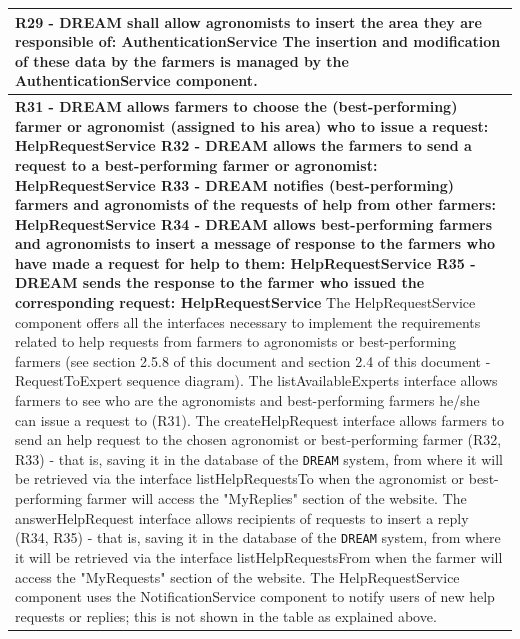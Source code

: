 \documentclass{article}
\begin{document}
\begin{longtable}[c]{|m{11.75cm}|}
    \textbf{R29 - DREAM shall allow agronomists to insert the area they are responsible of: AuthenticationService}
    \newline\newline
    The insertion and modification of these data by the farmers is managed by the AuthenticationService component.\\
    \hline
    
    \textbf{R31 - DREAM allows farmers to choose the (best-performing) farmer or agronomist (assigned to his area) who to issue a request: HelpRequestService
    \newline\newline
    R32 - DREAM allows the farmers to send a request to a best-performing farmer or agronomist: HelpRequestService
    \newline\newline
    R33 - DREAM notifies (best-performing) farmers and agronomists of the requests of help from other farmers: HelpRequestService
    \newline\newline
    R34 - DREAM allows best-performing farmers and agronomists to insert a message of response to the farmers who have made a request for help to them: HelpRequestService
    \newline\newline
    R35 - DREAM sends the response to the farmer who issued the corresponding request: HelpRequestService}
    \newline\newline
    The HelpRequestService component offers all the interfaces necessary to implement the requirements related to help requests from farmers to agronomists or best-performing farmers (see section 2.5.8 of this document  and section 2.4 of this document - RequestToExpert sequence diagram). The listAvailableExperts interface allows farmers to see who are the agronomists and best-performing farmers he/she can issue a request to (R31). The createHelpRequest interface allows farmers to send an help request to the chosen agronomist or best-performing farmer (R32, R33) - that is, saving it in the database of the \verb|DREAM| system, from where it will be retrieved via the interface listHelpRequestsTo when the agronomist or best-performing farmer will access the "MyReplies" section of the website. The answerHelpRequest interface allows recipients of requests to insert a reply (R34, R35) - that is, saving it in the database of the \verb|DREAM| system, from where it will be retrieved via the interface listHelpRequestsFrom when the farmer will access the "MyRequests" section of the website. The HelpRequestService component uses the NotificationService component to notify users of new help requests or replies; this is not shown in the table as explained above.
    \\
    \hline
    

\end{longtable}
\end{document}
